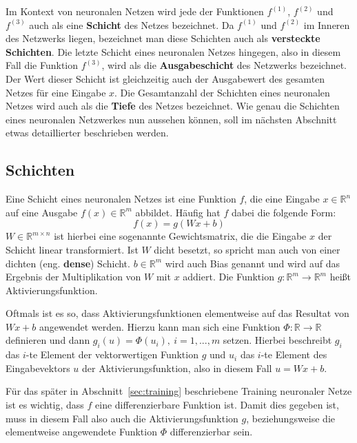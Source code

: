 Im Kontext von neuronalen Netzen wird jede der Funktionen
$f^{(1)}$, $f^{(2)}$ und $f^{(3)}$ auch als eine \textbf{Schicht} des
Netzes bezeichnet.
Da $f^{(1)}$ und $f^{(2)}$ im Inneren des Netzwerks liegen, bezeichnet man
diese Schichten auch als \textbf{versteckte Schichten}.
Die letzte Schicht eines neuronalen Netzes hingegen, also in diesem
Fall die Funktion $f^{(3)}$, wird als die \textbf{Ausgabeschicht} des
Netzwerks bezeichnet. Der Wert dieser Schicht ist gleichzeitig
auch der Ausgabewert des gesamten Netzes f\"ur eine Eingabe $x$.
Die Gesamtanzahl der Schichten eines neuronalen Netzes wird auch
als die \textbf{Tiefe} des Netzes bezeichnet.
Wie genau die Schichten eines neuronalen Netzwerkes nun aussehen k\"onnen,
soll im n\"achsten Abschnitt etwas detaillierter beschrieben werden.

\subsection{Schichten}
\label{sec:schichten}

Eine Schicht eines neuronalen Netzes ist eine Funktion $f$, die eine
Eingabe $x \in \mathbb{R}^n$ auf eine Ausgabe $f(x) \in \mathbb{R}^m$
abbildet. H\"aufig hat $f$ dabei die folgende Form:
\begin{equation}
    f(x) = g(Wx + b)
\end{equation}
$W \in \mathbb{R}^{m \times n}$ ist hierbei eine sogenannte Gewichtsmatrix,
die die Eingabe $x$ der Schicht linear transformiert.
Ist $W$ dicht besetzt, so spricht man auch von einer dichten
(eng. \textbf{dense}) Schicht.
$b \in \mathbb{R}^m$ wird auch Bias genannt und wird auf das Ergebnis der
Multiplikation von $W$ mit $x$ addiert.
Die Funktion $g: \mathbb{R}^m \rightarrow \mathbb{R}^m$ hei{\ss}t
Aktivierungsfunktion.

Oftmals ist es so, dass Aktivierungsfunktionen elementweise auf das
Resultat von $Wx + b$ angewendet werden. Hierzu kann man sich eine
Funktion $\Phi: \mathbb{R} \rightarrow \mathbb{R}$ definieren und dann
$g_i(u) = \Phi(u_i), \  i=1,...,m$ setzen. Hierbei beschreibt $g_i$
das $i$-te Element der vektorwertigen Funktion $g$ und $u_i$ das $i$-te
Element des Eingabevektors $u$ der Aktivierungsfunktion,
also in diesem Fall $u = Wx + b$.

F\"ur das sp\"ater in Abschnitt~\ref{sec:training} beschriebene
Training neuronaler Netze ist es wichtig, dass $f$ eine differenzierbare
Funktion ist. Damit dies gegeben ist, muss in diesem Fall also auch die
Aktivierungsfunktion $g$, beziehungsweise die elementweise angewendete
Funktion $\Phi$ differenzierbar sein.

